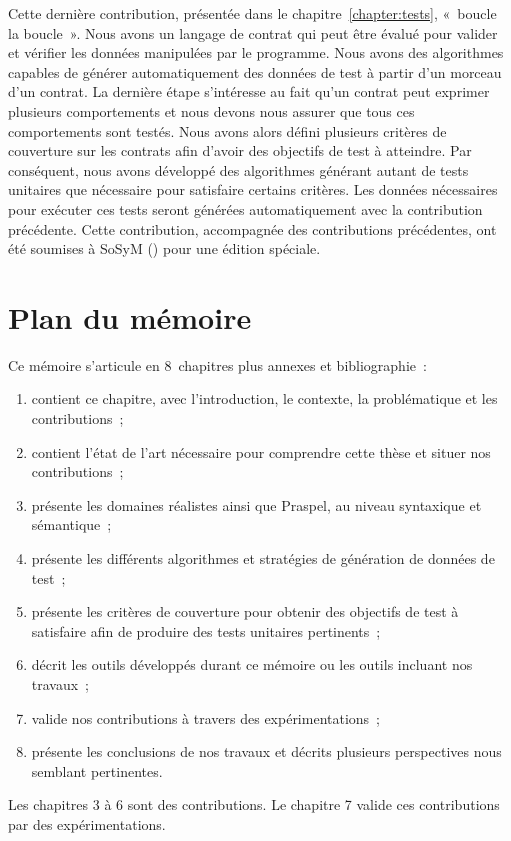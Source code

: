 Cette dernière contribution, présentée dans le chapitre~\ref{chapter:tests},
«~boucle la boucle~». Nous avons un langage de contrat qui peut être évalué pour
valider et vérifier les données manipulées par le programme. Nous avons des
algorithmes capables de générer automatiquement des données de test à partir
d'un morceau d'un contrat. La dernière étape s'intéresse au fait qu'un contrat
peut exprimer plusieurs comportements et nous devons nous assurer que tous ces
comportements sont testés. Nous avons alors défini plusieurs critères de
couverture sur les contrats afin d'avoir des objectifs de test à atteindre. Par
conséquent, nous avons développé des algorithmes générant autant de tests
unitaires que nécessaire pour satisfaire certains critères. Les données
nécessaires pour exécuter ces tests seront générées automatiquement avec la
contribution précédente. Cette contribution, accompagnée des contributions
précédentes, ont été soumises à SoSyM () pour une édition spéciale.

\section{Plan du mémoire}

Ce mémoire s'articule en 8~chapitres plus annexes et bibliographie~:
%
\begin{enumerate}

\item contient ce chapitre, avec l'introduction, le contexte, la problématique
et les contributions~;

\item contient l'état de l'art nécessaire pour comprendre cette thèse et situer
nos contributions~;

\item présente les domaines réalistes ainsi que Praspel, au niveau syntaxique et
sémantique~;

\item présente les différents algorithmes et stratégies de génération de données
de test~;

\item présente les critères de couverture pour obtenir des objectifs de test à
satisfaire afin de produire des tests unitaires pertinents~;

\item décrit les outils développés durant ce mémoire ou les outils incluant nos
travaux~;

\item valide nos contributions à travers des expérimentations~;

\item présente les conclusions de nos travaux et décrits plusieurs perspectives
nous semblant pertinentes.

\end{enumerate}
%
Les chapitres 3 à 6 sont des contributions. Le chapitre 7 valide ces
contributions par des expérimentations.
